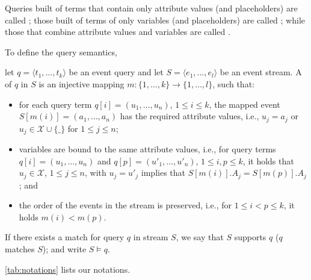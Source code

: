 Queries built of terms that contain only attribute values (and
placeholders) are called ; those
built of terms of only
variables (and placeholders) are called ;
while those
that combine attribute values and variables are called
.



To define the query semantics,

let $q=\langle t_1,\ldots,t_k \rangle$ be an event query and
let $S=\langle e_1, \ldots , e_l\rangle$ be an event stream.
A  of $q$ in $S$ is an injective mapping
$m: \{1,\ldots,k\}\rightarrow \{1, \ldots, l\}$,
such that:
\begin{itemize}[nosep,left=1em]
	\item for each query term $q[i]=(u_{1},\ldots,u_{n})$, $1\leq i\leq k$, the
	mapped event $S[m(i)]=(a_1,\ldots, a_n)$ has the required
	attribute
	values, i.e., $u_j = a_j$ or $u_j\in \mathcal{X}\cup \{\_ \}$
	for $1\leq 	j\leq n$;
	\item variables are bound to the same attribute values, i.e., for query
	terms $q[i]=(u_1,\ldots, u_n)$ and $q[p]=(u'_1,\ldots, u'_n)$, $1\leq
	i,p\leq k$, it holds that $u_j\in \mathcal{X}$, $1\leq j\leq n$, with
	$u_j=u'_j$ implies that $S[m(i)].A_j = S[m(p)].A_j$; and
 	\item the order of the events in the stream is preserved,
 	i.e., for $1\leq
	i<p\leq k$, it holds $m(i)<m(p)$.

\end{itemize}
If there exists a match for query $q$ in stream $S$, we say that
$S$ supports $q$ ($q$ matches $S$); and write $S \models q$.

\autoref{tab:notations} lists our notations.


